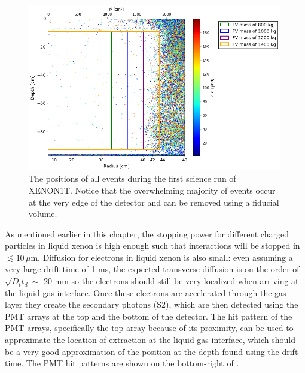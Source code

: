  \begin{figure}[t]
	\centering
	\includegraphics[width=0.99\textwidth]{tpc_pos_rec}
	\caption{The positions of all events during the first science run of XENON1T.  Notice that the overwhelming majority of events occur at the very edge of the detector and can be removed using a fiducial volume.}
	\label{fig:tpc_pos_rec}
\end{figure}

As mentioned earlier in this chapter, the stopping power for different charged particles in liquid xenon is high enough such that interactions will be stopped in $\lesssim 10 \, \mu \textrm{m}$.  Diffusion for electrons in liquid xenon is also small: even assuming a very large drift time of 1 ms, the expected transverse diffusion is on the order of $\sqrt{D_t t_d} \sim$ 20 mm so the electrons should still be very localized when arriving at the liquid-gas interface.  Once these electrons are accelerated through the gas layer they create the secondary photons (S2), which are then detected using the PMT arrays at the top and the bottom of the detector.  The hit pattern of the PMT arrays, specifically the top array because of its proximity, can be used to approximate the location of extraction at the liquid-gas interface, which should be a very good approximation of the position at the depth found using the drift time.  The PMT hit patterns are shown on the bottom-right of .

